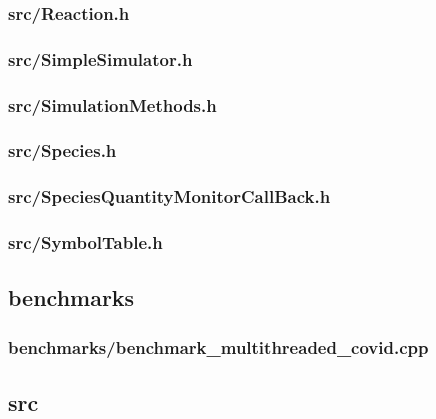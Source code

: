\subsubsection{src/Reaction.h}

\newpage
\subsubsection{src/SimpleSimulator.h}

\newpage
\subsubsection{src/SimulationMethods.h}

\newpage
\subsubsection{src/Species.h}

\newpage
\subsubsection{src/SpeciesQuantityMonitorCallBack.h}

\newpage
\subsubsection{src/SymbolTable.h}

\newpage
\subsection{benchmarks}
\subsubsection{benchmarks/benchmark\_multithreaded\_covid.cpp}

\newpage
\subsection{src}
